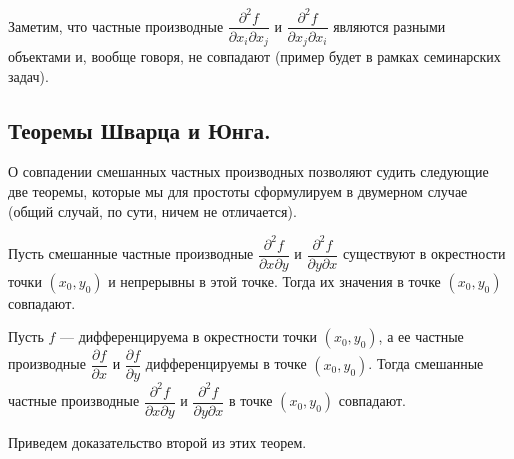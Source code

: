 \documentclass[a4paper]{article}
\theoremstyle{named}
\begin{document}
    \begin{remark*}
        Заметим, что частные производные $\dfrac{\partial^2 f}{\partial x_i\partial x_j}$ и $\dfrac{\partial^2 f}{\partial x_j\partial x_i}$ являются разными объектами и, вообще говоря, не совпадают (пример будет в рамках семинарских задач).
    \end{remark*}

    \subsection{Теоремы Шварца и Юнга.}

    О совпадении смешанных частных производных позволяют судить следующие две теоремы, которые мы для простоты сформулируем в двумерном случае (общий случай, по сути, ничем не отличается).

    \begin{theorem}[Шварц]
        Пусть смешанные частные производные $\dfrac{\partial^2f}{\partial x\partial y}$ и $\dfrac{\partial^2f}{\partial y\partial x}$ существуют в окрестности точки $(x_0,y_0)$ и непрерывны в этой точке. Тогда их значения в точке $(x_0,y_0)$ совпадают.
    \end{theorem}

    \begin{theorem}[Юнг] Пусть $f$ --- дифференцируема в окрестности точки $(x_0,y_0)$,
    а ее частные производные $\dfrac{\partial f}{\partial x}$ и $\dfrac{\partial f}{\partial y}$
    дифференцируемы в точке $(x_0,y_0)$.
    Тогда смешанные частные производные $\dfrac{\partial^2f}{\partial x\partial y}$
    и $\dfrac{\partial^2f}{\partial y\partial x}$
    в точке $(x_0,y_0)$ совпадают.
    \end{theorem}

    Приведем доказательство второй из этих теорем.
\end{document}
